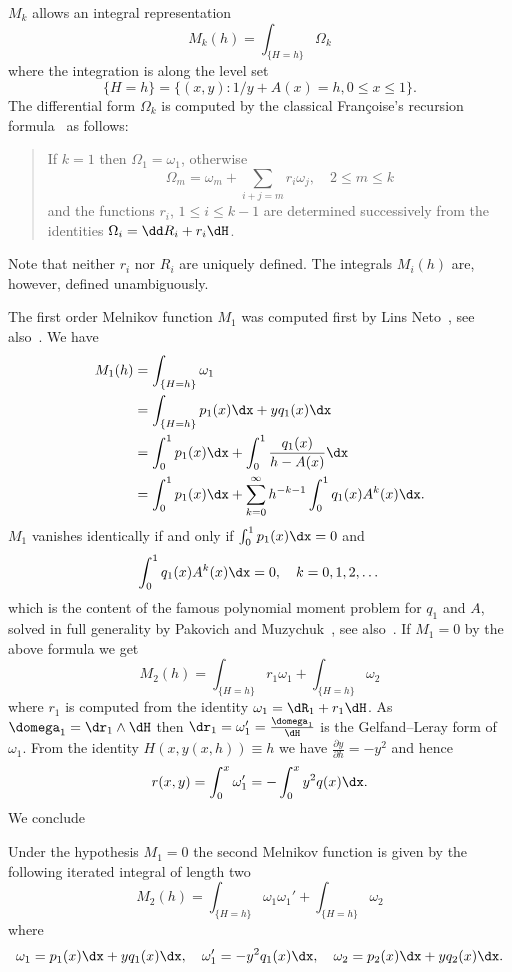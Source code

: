 $M_k$ allows an integral representation
\[
M_k(h) = \int_{\{H=h\}} \Omega_k
\]
where the integration is along the level set
\[
\{H=h\} = \{(x,y) : 1/y + A(x)= h, 0\leq x \leq 1 \}.
\]
The differential form $\Omega_k$ is computed by the classical Françoise's recursion formula~\cite{fran96,ilie98a,rous98} as follows:
\begin{quotation}
If $k=1$ then $\Omega_1 = \omega_1$, otherwise
\begin{equation}
\Omega_m = \omega_m + \sum_{i+j=m} r_i \omega_j, \quad 2 \leq m \leq k
\end{equation}
and the functions $r_i$, $1\leq i \leq k-1$ are determined successively from the identities $\Omega_i = \dd R_i + r_i \dH$.
\end{quotation}
Note that neither $r_i$ nor $R_i$ are uniquely defined. The integrals $M_i(h)$ are, however, defined unambiguously.

The first order Melnikov function $M_1$ was computed first by Lins Neto~\cite[Section~3]{lins80}, see also~\cite{bfy00}. We have
\begin{align*}
M_1(h) &= \int_{\{H=h\}} \omega_1 \\ &= \int_{\{H=h\}} p_1(x) \dx + yq_1(x) \dx\\
& = \int_0^1 p_1(x) \dx + \int_0^1 \frac{q_1(x)}{h - A(x)} \dx \\
& = \int_0^1 p_1(x) \dx + \sum_{k=0}^\infty h^{-k-1} \int_0^1 q_1(x) A^k(x)\dx.
\end{align*}
$M_1$ vanishes identically if and only if $\int_0^1 p_1(x) \dx = 0$ and
\[
\int_0^1 q_1(x) A^k(x) \dx = 0, \quad k= 0,1,2, \dots
\]
which is the content of the famous polynomial moment problem for $q_1$ and $A$, solved in full generality by Pakovich and Muzychuk~\cite{pamu09}, see also~\cite{bfy98,bfy99,bfy00,chri00,yomd03}. If $M_1=0$ by the above formula we get
\[
M_2(h)= \int_{\{H=h\}} r_1 \omega_1 + \int_{\{H=h\}} \omega_2
\]
where $r_1$ is computed from the identity $\omega_1= \dR_1 + r_1 \dH$. As $\domega_1 = \dr_1 \wedge \dH$ then $\dr_1 = \omega_1'= \frac{\domega_1}{\dH}$ is the Gelfand--Leray form of $\omega_1$. From the identity $H(x,y(x,h)) \equiv h$ we have $ \frac{\partial y}{\partial h} = - y^2$ and hence
\[
r(x,y)= \int_0^x \omega_1' = - \int_0^x y^2 q(x) \dx.
\]
We conclude


\begin{prop}\label{prop3.1}
Under the hypothesis $M_1=0$ the second Melnikov function is given by the following iterated integral of length two
\begin{equation}
M_2(h) = \int_{\{H=h\}} \omega_1 \omega_1' + \int_{\{H=h\}} \omega_2
\end{equation}
where
\[
\omega_1= p_1(x) \dx + yq_1(x) \dx,\quad \omega_1'= -y^2 q_1(x) \dx,\quad \omega_2= p_2(x) \dx + yq_2(x) \dx.
\]
\end{prop}

